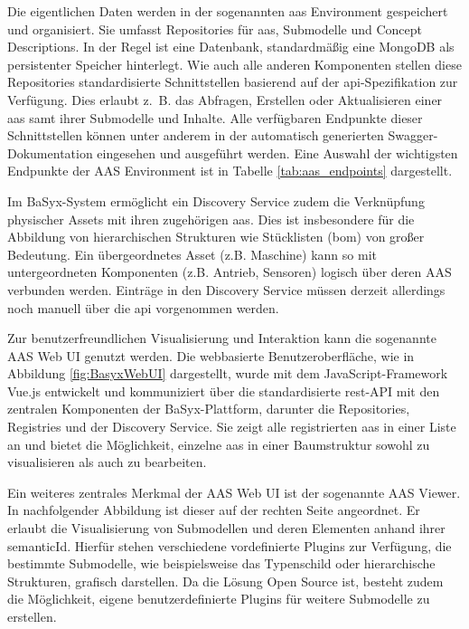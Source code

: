 \newpage
Die eigentlichen Daten werden in der sogenannten \acs{aas} Environment gespeichert und organisiert.
Sie umfasst Repositories für \acs{aas}, Submodelle und Concept Descriptions.
In der Regel ist eine Datenbank, standardmäßig eine MongoDB als persistenter Speicher hinterlegt.
Wie auch alle anderen Komponenten stellen diese Repositories standardisierte Schnittstellen basierend auf der \ac{api}-Spezifikation zur Verfügung.
Dies erlaubt z.~B. das Abfragen, Erstellen oder Aktualisieren einer \acs{aas} samt ihrer Submodelle und Inhalte.
Alle verfügbaren Endpunkte dieser Schnittstellen können unter anderem in der automatisch generierten Swagger-Dokumentation eingesehen und ausgeführt werden. 
Eine Auswahl der wichtigsten Endpunkte der AAS Environment ist in Tabelle \ref{tab:aas_endpoints} dargestellt.


\vspace{-0.5em}

Im BaSyx-System ermöglicht ein Discovery Service zudem die Verknüpfung physischer Assets mit ihren zugehörigen \acs{aas}.
Dies ist insbesondere für die Abbildung von hierarchischen Strukturen wie Stücklisten (\ac{bom}) von großer Bedeutung.
Ein übergeordnetes Asset (z.B. Maschine) kann so mit untergeordneten Komponenten (z.B. Antrieb, Sensoren) logisch über deren AAS verbunden werden.
Einträge in den Discovery Service müssen derzeit allerdings noch manuell über die \acs{api} vorgenommen werden.

Zur benutzerfreundlichen Visualisierung und Interaktion kann die sogenannte AAS Web UI genutzt werden.
Die webbasierte Benutzeroberfläche, wie in Abbildung \ref{fig:BasyxWebUI} dargestellt, wurde mit dem JavaScript-Framework Vue.js entwickelt und kommuniziert über die standardisierte \acs{rest}-API mit den zentralen Komponenten der BaSyx-Plattform, darunter die Repositories, Registries und der Discovery Service.
Sie zeigt alle registrierten \acs{aas} in einer Liste an und bietet die Möglichkeit, einzelne \acs{aas} in einer Baumstruktur sowohl zu visualisieren als auch zu bearbeiten. 

Ein weiteres zentrales Merkmal der AAS Web UI ist der sogenannte AAS Viewer.
In nachfolgender Abbildung ist dieser auf der rechten Seite angeordnet.
Er erlaubt die Visualisierung von Submodellen und deren Elementen anhand ihrer semanticId. 
Hierfür stehen verschiedene vordefinierte Plugins zur Verfügung, die bestimmte Submodelle, wie beispielsweise das Typenschild oder hierarchische Strukturen, grafisch darstellen.
Da die Lösung Open Source ist, besteht zudem die Möglichkeit, eigene benutzerdefinierte Plugins für weitere Submodelle zu erstellen. \cite{BaSyxWiki,BaSyxEclipse} 

